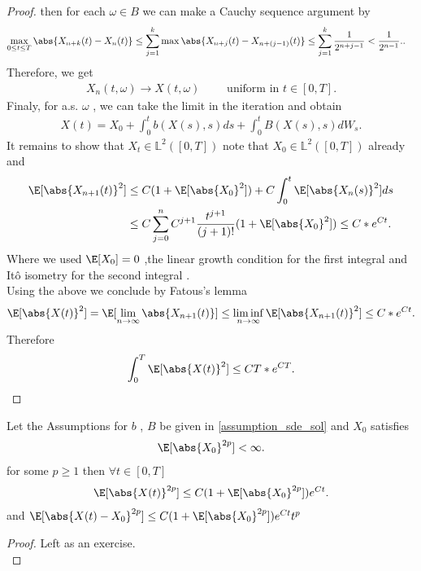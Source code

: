 \begin{proof}
   then for each $\omega  \in  B$  we can make a Cauchy sequence argument by
   \begin{align*}
     \max_{0\le t\le T} \abs{X_{n+k}(t) - X_{n}(t) } &\le  \sum_{j=1}^{k} \max \abs{X_{n+j}(t) - X_{n+(j-1)}(t) }\le \sum_{j=1}^{k} \frac{1}{2^{n+j-1} }< \frac{1}{2^{n-1} }. 
   .\end{align*}
   Therefore, we get 
   \begin{align*}
     X_{n}(t,\omega ) \to X(t,\omega ) \qquad \text{ uniform in } t\in [0,T]
   .\end{align*}
   Finaly, for a.s. $\omega $ , we can take the limit in the iteration  and obtain 
   \begin{align*}
    X(t) = X_{0} + \int_0^{t} b(X(s),s) ds + \int_0^{t} B(X(s),s) dW_s  
   .\end{align*}
   It remains to show that $X_t \in  \mathbb{L}^2([0,T])$ note that $X_{0} \in  \mathbb{L}^2([0,T])$ already and 
   \begin{align*}
     \E[\abs{X_{n+1}(t)}^2] &\le  C(1+\E[\abs{X_0}^2]) + C \int_0^{t} \E[\abs{X_{n}(s) }^2] ds \\
                           &\le  C \sum_{j=0}^{n} C^{j+1} \frac{t^{j+1}}{(j+1)!} (1+\E[\abs{X_0}^2]) \le  C* e^{Ct} 
   .\end{align*}
   Where we used $\E[X_{0}] = 0$ ,the  linear growth condition for the first integral and It\^o isometry for the second integral .\\[1ex]
    Using the above we conclude by Fatous's lemma
    \begin{align*}
      \E[\abs{X(t)}^2] = \E[\lim_{n\to \infty} \abs{X_{n+1}(t) }]  \le  \liminf_{n\to \infty} \E[\abs{X_{n+1}(t) }^2] \le C*e^{Ct} 
    .\end{align*}
    Therefore 
    \begin{align*}
      \int_0^{T} \E[\abs{X(t)}^2]  \le  CT*e^{CT} 
    .\end{align*}
\end{proof}

\begin{theorem}
 Let the Assumptions for $b$ , $B$ be given in \autoref{assumption_sde_sol} and $X_{0}$ satisfies
  \begin{align*}
    \E[\abs{X_0}^{2p} ]< \infty
  .\end{align*}
  for some $p \ge 1$ then $\forall  t \in  [0,T]$ 
  \begin{align*}
    \E[\abs{X(t)}^{2p}]\le C(1+\E[\abs{X_0}^{2p} ])e^{Ct} 
  .\end{align*}
  and $\E[\abs{X(t) - X_0}^{2p} ] \le  C(1+\E[\abs{X_0}^{2p} ])e^{Ct}t^p $
\end{theorem}
\begin{proof}
 Left as an exercise. \\
\end{proof}
